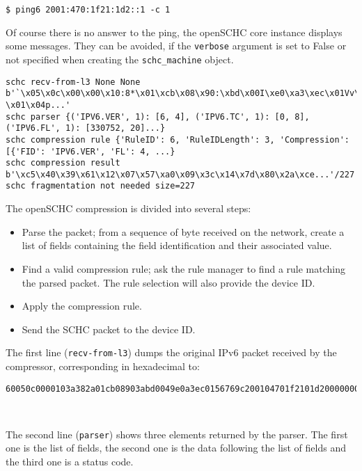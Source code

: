 \begin{lstlisting}
$ ping6 2001:470:1f21:1d2::1 -c 1
\end{lstlisting}

Of course there is no answer to the ping, the openSCHC core instance displays some messages. They can be avoided, if the \texttt{verbose} argument is set to False or not specified when creating the \texttt{schc\_machine} object. 

\begin{lstlisting}[basicstyle=\ttfamily\tiny]
schc recv-from-l3 None None b'`\x05\x0c\x00\x00\x10:8*\x01\xcb\x08\x90:\xbd\x00I\xe0\xa3\xec\x01Vv\x9c \x01\x04p...'
schc parser {('IPV6.VER', 1): [6, 4], ('IPV6.TC', 1): [0, 8], ('IPV6.FL', 1): [330752, 20]...} 
schc compression rule {'RuleID': 6, 'RuleIDLength': 3, 'Compression': [{'FID': 'IPV6.VER', 'FL': 4, ...}
schc compression result b'\xc5\x40\x39\x61\x12\x07\x57\xa0\x09\x3c\x14\x7d\x80\x2a\xce...'/227
schc fragmentation not needed size=227
\end{lstlisting}
 
The openSCHC compression is divided into several steps:
\begin{itemize}
\item Parse the packet; from a sequence of byte received on the network, create a list of fields containing the field identification and their associated value.
\item Find a valid compression rule; ask the rule manager to find a rule matching the parsed packet. The rule selection will also provide the device ID.
\item Apply the compression rule.
\item Send the SCHC packet to the device ID.
\end{itemize}

The first line (\texttt{recv-from-l3}) dumps the original IPv6 packet received by the compressor, corresponding in hexadecimal to:

\begin{lstlisting}[basicstyle=\ttfamily\tiny]
60050c0000103a382a01cb08903abd0049e0a3ec0156769c200104701f2101d20000000000000001800051fb48b20000609f882600060ed2
\end{lstlisting}

~  

The second line (\texttt{parser}) shows three elements returned by the parser. The first one is the list of fields, the second one is the data following the list of fields and the third one is a status code.

